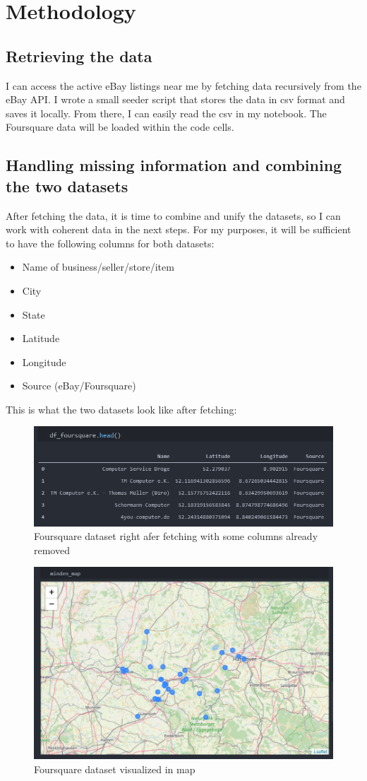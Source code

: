 \chapter{Methodology}
\section{Retrieving the data}
I can access the active eBay listings near me by fetching data recursively from the eBay API. I wrote a small seeder script that stores the data in csv format and saves it locally. From there, I can easily read the csv in my notebook. The Foursquare data will be loaded within the code cells.
\section{Handling missing information and combining the two datasets}
After fetching the data, it is time to combine and unify the datasets, so I can work with coherent data in the next steps. For my purposes, it will be sufficient to have the following columns for both datasets:
\begin{itemize}
	\item Name of business/seller/store/item
	\item City
	\item State
	\item Latitude
	\item Longitude
	\item Source (eBay/Foursquare)
\end{itemize}
This is what the two datasets look like after fetching:
\begin{figure}[H]
	\includegraphics[width=\textwidth]{Bilder/Foursquare.PNG}
	\caption{Foursquare dataset right afer fetching with some columns already removed}
\end{figure}
\begin{figure}[H]
	\includegraphics[width=\textwidth]{Bilder/Foursquare_Map.PNG}
	\caption{Foursquare dataset visualized in map}
\end{figure}
